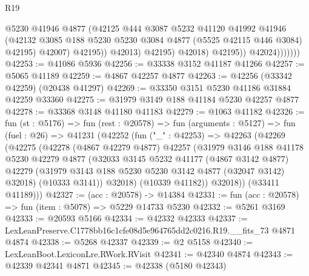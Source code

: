 \begin{lexlean}{R19}
\begin{coremodule}
                                @5230
                                @41946
                                @4877
                                (@42125
                                  @444
                                  @3087
                                  @5232
                                  @41120
                                  @41992
                                  @41946
                                  (@42132
                                    @3085
                                    @188
                                    @5230
                                    @5230
                                    @3084
                                    @4877
                                    (@5525 @42115 @446 @3084)
                                    @42195)
                                  @42007)
                                @42195))
                            @42013)
                          @42195)
                        @42018)
                      @42195))
                  @42024)))))))
@42253 := @41086 @5936
@42256 := @33338 @3152 @41187 @41266
@42257 := @5065 @41189
@42259 := @4867 @42257 @4877
@42263 := @42256 (@33342 @42259) (@20438 @41297)
@42269 := @33350 @3151 @5230 @41186 @31884 @42259 @33360
@42275 := @31979 @3149 @188 @41184 @5230 @42257 @4877
@42278 := @33368 @3148 @41180 @41183
@42279 := @1063 @41182
@42326 := fun (st : @5176) =>
  fun (rest : @20578) =>
  fun (arguments : @5127) =>
  fun (fuel : @26) =>
  @41231
    (@42252
      (fun ("_" : @42253) =>
      @42263
        (@42269
          (@42275
            (@42278
              (@4867 @42279 @4877)
              @42257
              (@31979
                @3146
                @188
                @41178
                @5230
                @42279
                @4877
                (@32033
                  @3145
                  @5232
                  @41177
                  (@4867 @3142 @4877)
                  @42279
                  (@31979 @3143 @188 @5230 @5230 @3142 @4877 (@32047 @3142) @32018)
                  (@10333 @3141))
                @32018)
              (@10339 @41182))
            @32018))
        (@33411 @41189)))
@42327 := (acc : @20578) -> @14384
@42331 := fun (acc : @20578) => fun (item : @5078) => @5229 @14733 @5230
@42332 := @5261 @3169
@42333 := @20593 @5166
@42334 := @42332 @42333
@42337 := LexLeanPreserve.C1778bb16c1cfe08d5e964765dd2c0216.R19.__fits_73 @4871 @4874
@42338 := @5268 @42337
@42339 := @2 @5158
@42340 := LexLeanBoot.LexiconLre.RWork.RVisit
@42341 := @42340 @4874
@42343 := @42339 @42341 @4871
@42345 := @42338 (@5180 @42343)

\end{coremodule}
\end{lexlean}

